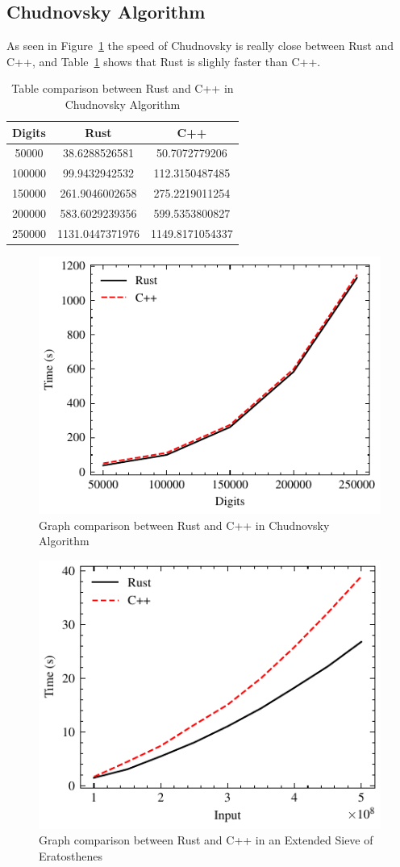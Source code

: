 \documentclass[10pt]{IEEEtran}
\begin{document}
\subsection{Chudnovsky Algorithm}
As seen in Figure~\ref{pi-graph} the speed of Chudnovsky is really close between Rust and C++, and Table~\ref{pi-table} shows that Rust is slighly faster than C++.
\begin{table}[!ht]
    \centering
    \begin{tabular}{|c|c|c|}
    \hline
        \rowcolor{lightgray}
        Digits & Rust & C++ \\ \hline
        50000 & 38.6288526581 & 50.7072779206 \\ \hline
        100000 & 99.9432942532 & 112.3150487485 \\ \hline
        150000 & 261.9046002658 & 275.2219011254 \\ \hline
        200000 & 583.6029239356 & 599.5353800827 \\ \hline
        250000 & 1131.0447371976 & 1149.8171054337 \\ \hline
    \end{tabular}
    \caption{\label{pi-table}Table comparison between Rust and C++ in Chudnovsky Algorithm}
\end{table}
\begin{figure}[h]
    \centering
    \includegraphics{piplot}
    \caption{\label{pi-graph}Graph comparison between Rust and C++ in Chudnovsky Algorithm}
\end{figure}
\begin{figure}[h]
    \centering
    \includegraphics{sieveplot}
    \caption{\label{sieve-graph}Graph comparison between Rust and C++ in an Extended Sieve of Eratosthenes}
\end{figure}

\nocite{*}


\end{document}
